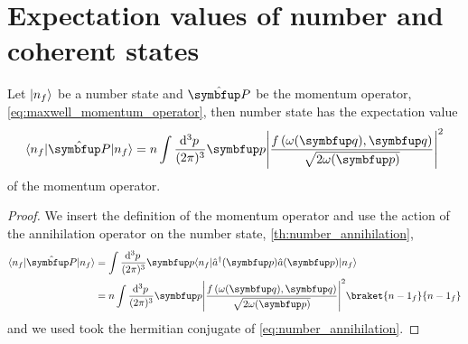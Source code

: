 \section{Expectation values of number and coherent states}

\begin{lemma}
	Let $\lvert n_f\rangle$ be a number state and $\vu{P}$ be the momentum operator, \cref{eq:maxwell_momentum_operator}, then number state has the expectation value
	\begin{equation}
		\bra{n_f}
		\vu{P}
		\ket{n_f}
		=
		n
		\int\frac{\dd[3]{p}}{(2\pi)^3}
		\vb{p}
		\abs*{\frac{f\left(\omega(\vb{q}),\vb{q}\right)}{\sqrt{2\omega(\vb{p})}}}^2
	\end{equation}
	of the momentum operator.
\end{lemma}
\begin{proof}
	We insert the definition of the momentum operator and use the action of the annihilation operator on the number state, \cref{th:number_annihilation},
	\begin{equation}
		\begin{split}
			\bra{n_f}
			\vu{P}
			\ket{n_f}
			&=
			\int\frac{\dd[3]{p}}{(2\pi)^3}
			\vb{p}
			\bra{n_f}
			\hat{a}^\dagger(\vb{p})
			\hat{a}(\vb{p})
			\ket{n_f}
			\\
			&=
			n
			\int\frac{\dd[3]{p}}{(2\pi)^3}
			\vb{p}
			\abs*{\frac{f\left(\omega(\vb{q}),\vb{q}\right)}{\sqrt{2\omega(\vb{p})}}}^2
			\braket{{n-1}_f}{{n-1}_f}
		\end{split}
	\end{equation}
	and we used took the hermitian conjugate of \cref{eq:number_annihilation}.
\end{proof}

